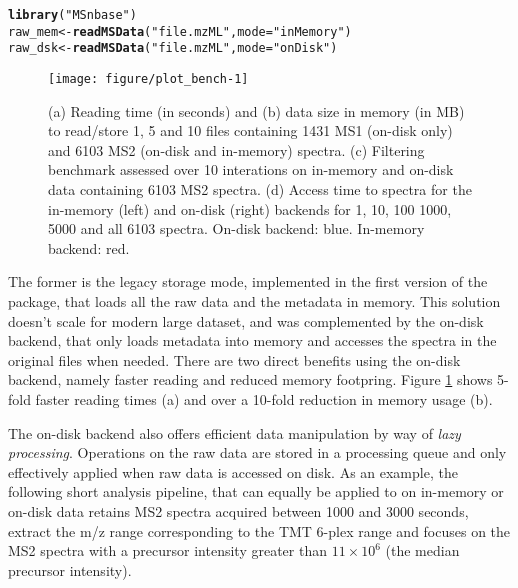\documentclass[journal=jacsat,manuscript=article]{achemso}\usepackage[]{graphicx}\usepackage[]{color}
\makeatletter
\def\maxwidth{ %
  \ifdim\Gin@nat@width>\linewidth
    \linewidth
  \else
    \Gin@nat@width
  \fi
}
\newcommand{\hlstr}[1]{\textcolor[rgb]{0.192,0.494,0.8}{#1}}%
\newcommand{\hlstd}[1]{\textcolor[rgb]{0.345,0.345,0.345}{#1}}%
\newcommand{\hlkwb}[1]{\textcolor[rgb]{0.69,0.353,0.396}{#1}}%
\newcommand{\hlkwc}[1]{\textcolor[rgb]{0.333,0.667,0.333}{#1}}%
\newcommand{\hlkwd}[1]{\textcolor[rgb]{0.737,0.353,0.396}{\textbf{#1}}}%
\newenvironment{kframe}{%
 \def\at@end@of@kframe{}%
 \ifinner\ifhmode%
  \def\at@end@of@kframe{\end{minipage}}%
  \begin{minipage}{\columnwidth}%
 \fi\fi%
 \def\FrameCommand##1{\hskip\@totalleftmargin \hskip-\fboxsep
 \colorbox{shadecolor}{##1}\hskip-\fboxsep
     \hskip-\linewidth \hskip-\@totalleftmargin \hskip\columnwidth}%
 \MakeFramed {\advance\hsize-\width
   \@totalleftmargin\z@ \linewidth\hsize
   \@setminipage}}%
 {\par\unskip\endMakeFramed%
 \at@end@of@kframe}
\newenvironment{knitrout}{}{} %
\def\maxwidth{ %
  \ifdim\Gin@nat@width>\linewidth
    \linewidth
  \else
    \Gin@nat@width
  \fi
}
\makeatother
\begin{document}
\begin{knitrout}
\color{fgcolor}\begin{kframe}
\begin{alltt}
\hlkwd{library}\hlstd{(}\hlstr{"MSnbase"}\hlstd{)}
\hlstd{raw_mem} \hlkwb{<-} \hlkwd{readMSData}\hlstd{(}\hlstr{"file.mzML"}\hlstd{,} \hlkwc{mode} \hlstd{=} \hlstr{"inMemory"}\hlstd{)}
\hlstd{raw_dsk} \hlkwb{<-} \hlkwd{readMSData}\hlstd{(}\hlstr{"file.mzML"}\hlstd{,} \hlkwc{mode} \hlstd{=} \hlstr{"onDisk"}\hlstd{)}
\end{alltt}
\end{kframe}
\end{knitrout}







\begin{figure}[p]
  \centering
\begin{knitrout}
\color{fgcolor}
\texttt{[image: figure/plot\_bench-1]} 

\end{knitrout}
\caption{(a) Reading time (in seconds) and (b) data size in memory (in
  MB) to read/store 1, 5 and 10 files containing 1431 MS1 (on-disk
  only) and 6103 MS2 (on-disk and in-memory) spectra. (c) Filtering
  benchmark assessed over 10 interations on in-memory and on-disk data
  containing 6103 MS2 spectra.  (d) Access time to spectra for the
  in-memory (left) and on-disk (right) backends for 1, 10, 100 1000,
  5000 and all 6103 spectra. On-disk backend: blue. In-memory backend:
  red. }
\label{fig:bench}
\end{figure}


The former is the legacy storage mode, implemented in the first
version of the package, that loads all the raw data and the metadata
in memory. This solution doesn't scale for modern large dataset, and
was complemented by the on-disk backend, that only loads metadata into
memory and accesses the spectra in the original files when
needed. There are two direct benefits using the on-disk backend,
namely faster reading and reduced memory footpring. Figure
\ref{fig:bench} shows 5-fold faster reading times (a) and over a
10-fold reduction in memory usage (b).

The on-disk backend also offers efficient data manipulation by way of
\textit{lazy processing}. Operations on the raw data are stored in a
processing queue and only effectively applied when raw data is
accessed on disk. As an example, the following short analysis
pipeline, that can equally be applied to on in-memory or on-disk data
retains MS2 spectra acquired between 1000 and 3000 seconds, extract
the m/z range corresponding to the TMT 6-plex range and focuses on the
MS2 spectra with a precursor intensity greater than $11 \times 10^6$
(the median precursor intensity). 
\end{document}
